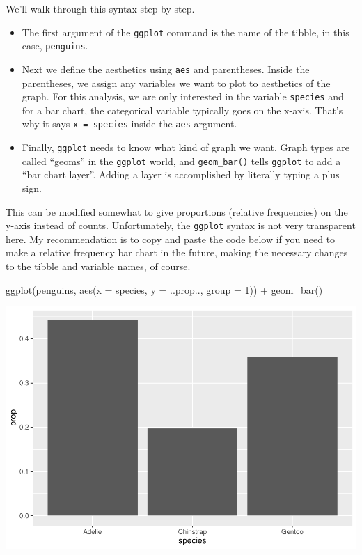 \documentclass[
]{book}
\newenvironment{Shaded}{\begin{snugshade}}{\end{snugshade}}
\newcommand{\AttributeTok}[1]{\textcolor[rgb]{0.77,0.63,0.00}{#1}}
\newcommand{\DecValTok}[1]{\textcolor[rgb]{0.00,0.00,0.81}{#1}}
\newcommand{\FunctionTok}[1]{\textcolor[rgb]{0.00,0.00,0.00}{#1}}
\newcommand{\NormalTok}[1]{#1}
\newcommand{\SpecialCharTok}[1]{\textcolor[rgb]{0.00,0.00,0.00}{#1}}
\providecommand{\tightlist}{%
  \setlength{\itemsep}{0pt}\setlength{\parskip}{0pt}}
\begin{document}
We'll walk through this syntax step by step.

\begin{itemize}
\tightlist
\item
  The first argument of the \texttt{ggplot} command is the name of the tibble, in this case, \texttt{penguins}.
\item
  Next we define the aesthetics using \texttt{aes} and parentheses. Inside the parentheses, we assign any variables we want to plot to aesthetics of the graph. For this analysis, we are only interested in the variable \texttt{species} and for a bar chart, the categorical variable typically goes on the x-axis. That's why it says \texttt{x\ =\ species} inside the \texttt{aes} argument.
\item
  Finally, \texttt{ggplot} needs to know what kind of graph we want. Graph types are called ``geoms'' in the \texttt{ggplot} world, and \texttt{geom\_bar()} tells \texttt{ggplot} to add a ``bar chart layer''. Adding a layer is accomplished by literally typing a plus sign.
\end{itemize}

This can be modified somewhat to give proportions (relative frequencies) on the y-axis instead of counts. Unfortunately, the \texttt{ggplot} syntax is not very transparent here. My recommendation is to copy and paste the code below if you need to make a relative frequency bar chart in the future, making the necessary changes to the tibble and variable names, of course.

\begin{Shaded}
\begin{Highlighting}[]
\FunctionTok{ggplot}\NormalTok{(penguins, }\FunctionTok{aes}\NormalTok{(}\AttributeTok{x =}\NormalTok{ species, }\AttributeTok{y =}\NormalTok{ ..prop.., }\AttributeTok{group =} \DecValTok{1}\NormalTok{)) }\SpecialCharTok{+}
    \FunctionTok{geom\_bar}\NormalTok{()}
\end{Highlighting}
\end{Shaded}

\includegraphics{intro_stats_files/figure-latex/unnamed-chunk-54-1.pdf}
\end{document}
